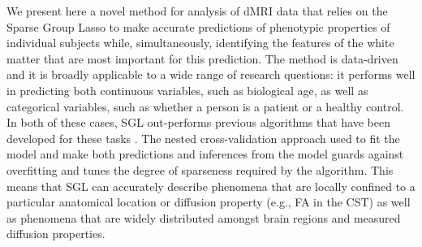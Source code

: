 \documentclass[10pt,letterpaper]{article}
\begin{document}
We present here a novel method for analysis of dMRI  data that
relies on the Sparse Group Lasso \cite{simon2013sparse} to make accurate
predictions of phenotypic properties of individual subjects while,
simultaneously, identifying the features of the white matter that are most
important for this prediction. The method is data-driven and it is broadly
applicable to a wide range of research questions: it performs well in
predicting both continuous variables, such as biological age, as well as
categorical variables, such as whether a person is a patient or a healthy
control. In both of these cases, SGL out-performs previous algorithms that
have been developed for these tasks \cite{sarica2017corticospinal,
Richard2018-ux, mcpherson2020single}. The nested cross-validation approach
used to fit the model and make both predictions and inferences from the model
guards against overfitting and tunes the degree of sparseness required by the
algorithm. This means that SGL can accurately describe phenomena that are
locally confined to a particular anatomical location or diffusion property
(e.g., FA in the CST) as well as phenomena that are widely distributed
amongst brain regions and measured diffusion properties.
\end{document}
